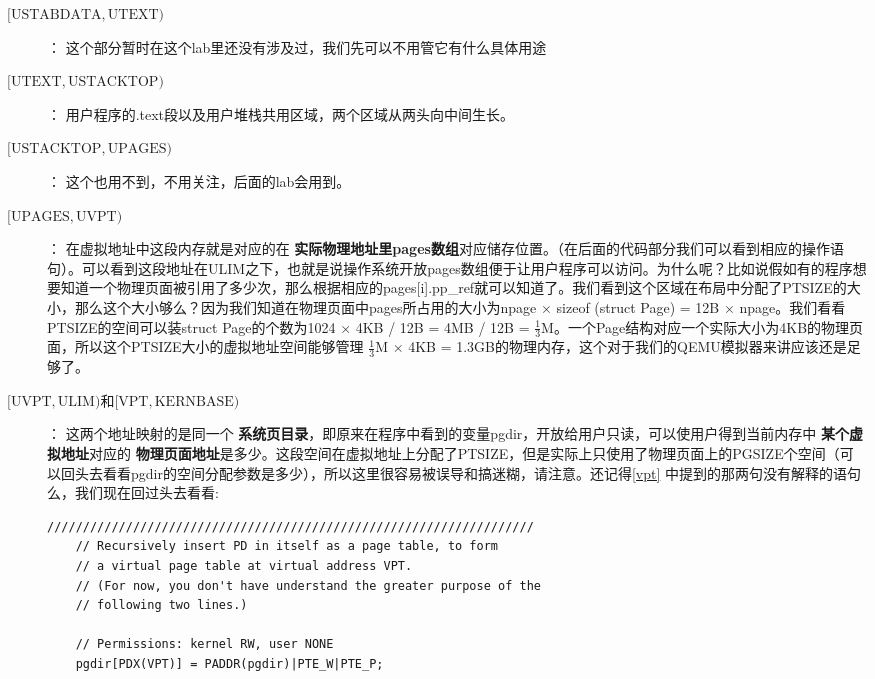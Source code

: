 \documentclass{article}
\newcommand{\highlight}[1]{{\bfseries \color{red}  #1}}
\begin{document}
\begin{CJK*}{UTF8}{gkai}
\begin{description}
\item[$[\mathrm{USTABDATA},\mathrm{UTEXT})$] ：\newline
这个部分暂时在这个lab里还没有涉及过，我们先可以不用管它有什么具体用途
\item[$[\mathrm{UTEXT},\mathrm{USTACKTOP})$] ：\newline
用户程序的.text段以及用户堆栈共用区域，两个区域从两头向中间生长。
\item[$[\mathrm{USTACKTOP},\mathrm{UPAGES})$] ：\newline
这个也用不到，不用关注，后面的lab会用到。
\item[$[\mathrm{UPAGES},\mathrm{UVPT})$] ：\newline
在虚拟地址中这段内存就是对应的在\highlight{实际物理地址里pages数组}对应储存位置。（在后面的代码部分我们可以看到相应的操作语句）。可以看到这段地址在ULIM之下，也就是说操作系统开放pages数组便于让用户程序可以访问。为什么呢？比如说假如有的程序想要知道一个物理页面被引用了多少次，那么根据相应的pages[i].pp\_ref就可以知道了。我们看到这个区域在布局中分配了PTSIZE的大小，那么这个大小够么？因为我们知道在物理页面中pages所占用的大小为npage $\times$ sizeof (struct Page) = 12B $\times$ npage。我们看看PTSIZE的空间可以装struct Page的个数为1024 $\times$ 4KB / 12B = 4MB / 12B = $\frac{1}{3}$M。一个Page结构对应一个实际大小为4KB的物理页面，所以这个PTSIZE大小的虚拟地址空间能够管理 $\frac{1}{3}$M $\times$ 4KB = 1.3GB的物理内存，这个对于我们的QEMU模拟器来讲应该还是足够了。
\item[$[\mathrm{UVPT},\mathrm{ULIM})$和$[\mathrm{VPT},\mathrm{KERNBASE})$] ：\newline
这两个地址映射的是同一个\highlight{系统页目录}，即原来在程序中看到的变量pgdir，开放给用户只读，可以使用户得到当前内存中\highlight{某个虚拟地址}对应的\highlight{物理页面地址}是多少。这段空间在虚拟地址上分配了PTSIZE，但是实际上只使用了物理页面上的PGSIZE个空间（可以回头去看看pgdir的空间分配参数是多少），所以这里很容易被误导和搞迷糊，请注意。还记得\ref{vpt} 中提到的那两句没有解释的语句么，我们现在回过头去看看:
\begin{lstlisting}[style=ccode, title={\scriptsize \ttfamily \bfseries kern/pmap.c: i386\_vm\_init ()}]
    ////////////////////////////////////////////////////////////////////
    // Recursively insert PD in itself as a page table, to form
    // a virtual page table at virtual address VPT.
    // (For now, you don't have understand the greater purpose of the
    // following two lines.)

    // Permissions: kernel RW, user NONE
    pgdir[PDX(VPT)] = PADDR(pgdir)|PTE_W|PTE_P;


\end{lstlisting}
\end{description}
\end{CJK*}
\end{document}
